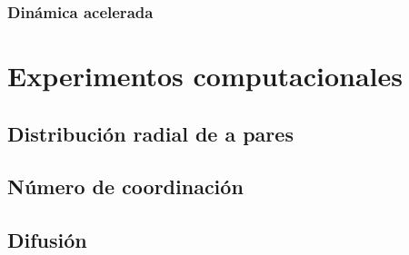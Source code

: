 \subsubsection{Dinámica acelerada}

\section{Experimentos computacionales}

\subsection{Distribución radial de a pares}

\subsection{Número de coordinación}

\subsection{Difusión}
